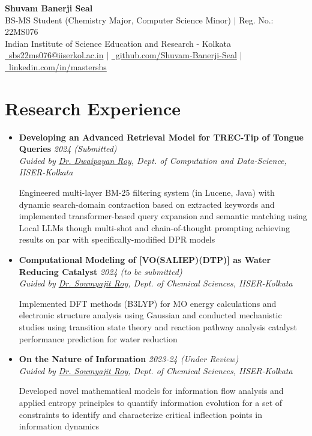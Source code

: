 \documentclass[a4paper,11pt]{article}
\newcommand{\resumeProject}[4]{
    \item\small{
        \textbf{#1} \hfill \textit{#2}\\
        \textit{#3}\\
        \begin{itemize}[leftmargin=1.5em,label=\textbullet,nosep,itemsep=0.5pt]
            #4
        \end{itemize}
    }\vspace{2pt}
}
\newcommand{\compactSection}[2]{
    \section{#1}
    \vspace{-0.1cm}
    #2
    \vspace{-0.2cm}
}
\begin{document}
\selectfont

\begin{center}
    \textbf{\Large Shuvam Banerji Seal}\\[0.3em]
    \small{
        BS-MS Student (Chemistry Major, Computer Science Minor) $\mid$ Reg. No.: 22MS076\\[0.2em]
        Indian Institute of Science Education and Research - Kolkata\\[0.2em]
        \href{mailto:sbs22ms076@iiserkol.ac.in}{\faEnvelope\ sbs22ms076@iiserkol.ac.in} $\mid$
        \href{https://github.com/Shuvam-Banerji-Seal}{\faGithub\ github.com/Shuvam-Banerji-Seal} $\mid$
        \href{https://www.linkedin.com/in/mastersbs}{\faLinkedin\ linkedin.com/in/mastersbs}
    }
\end{center}

\compactSection{Research Experience}{
\begin{itemize}[leftmargin=*,label={},itemsep=4pt]

    \resumeProject{Developing an Advanced Retrieval Model for TREC-Tip of Tongue Queries}{2024 (Submitted)}
    {Guided by \href{https://dwaipayanroy.github.io/}{Dr. Dwaipayan Roy}, Dept. of Computation and Data-Science, IISER-Kolkata}
    {Engineered multi-layer BM-25 filtering system (in Lucene, Java) with dynamic search-domain contraction based on extracted keywords and implemented transformer-based query expansion and semantic matching using Local LLMs though multi-shot and chain-of-thought prompting achieving results on par with specifically-modified DPR models}
     
    \resumeProject{Computational Modeling of [VO(SALIEP)(DTP)] as Water Reducing Catalyst}{2024 (to be submitted)}
    {Guided by \href{https://soumyajit-roy.com/}{Dr. Soumyajit Roy}, Dept. of Chemical Sciences, IISER-Kolkata}
    {Implemented DFT methods (B3LYP) for MO energy calculations and electronic structure analysis using Gaussian and conducted mechanistic studies using transition state theory and reaction pathway analysis catalyst performance prediction for water reduction}
    

    
    \resumeProject{On the Nature of Information}{2023-24 (Under Review)}
    {Guided by \href{https://soumyajit-roy.com/}{Dr. Soumyajit Roy}, Dept. of Chemical Sciences, IISER-Kolkata}
    {Developed novel mathematical models for information flow analysis and applied entropy principles to quantify information evolution for a set of constraints to identify and characterize critical inflection points in information dynamics}
    
\end{itemize}}
\end{document}
